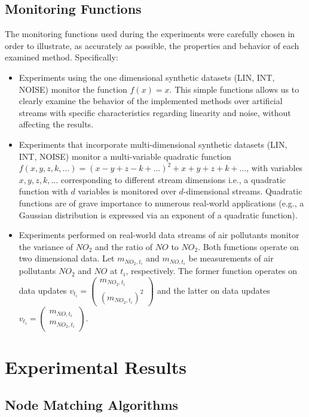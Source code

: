 \subsection{Monitoring Functions}

The monitoring functions used during the experiments were carefully chosen in order to illustrate, as accurately as possible, the properties and behavior of each examined method. Specifically:
\begin{itemize}
\item Experiments using the one dimensional synthetic datasets (LIN, INT, NOISE) monitor the function $f(x)=x$. This simple functions allows us to clearly examine the behavior of the implemented methods over artificial streams with specific characteristics regarding linearity and noise, without affecting the results.
\item Experiments that incorporate multi-dimensional synthetic datasets (LIN, INT, NOISE) monitor a multi-variable quadratic function $f(x,y,z,k,\dots)=(x-y+z-k+\dots)^2+x+y+z+k+\dots$, with variables $x,y,z,k,\dots$ corresponding to different stream dimensions i.e., a quadratic function with $d$ variables is monitored over $d$-dimensional streams. Quadratic functions are of grave importance to numerous real-world applications (e.g., a Gaussian distribution is expressed via an exponent of a quadratic function).
\item Experiments performed on real-world data streams of air pollutants monitor the variance of $NO_2$ and the ratio of $NO$ to $NO_2$. Both functions operate on two dimensional data. Let $m_{NO_2,t_i}$ and $m_{NO,t_i}$ be measurements of air pollutants $NO_2$ and $NO$ at $t_i$, respectively. The former function operates on data updates $v_{t_i}=\left(\begin{smallmatrix}m_{NO_2,t_i}\\(m_{NO_2,t_i})^2\end{smallmatrix}\right)$ and the latter on data updates $v_{t_i}=\left(\begin{smallmatrix}m_{NO,t_i}\\m_{NO_2,t_i}\end{smallmatrix}\right)$.
\end{itemize}

\section{Experimental Results} \label{sec:exp}

\subsection{Node Matching Algorithms}


